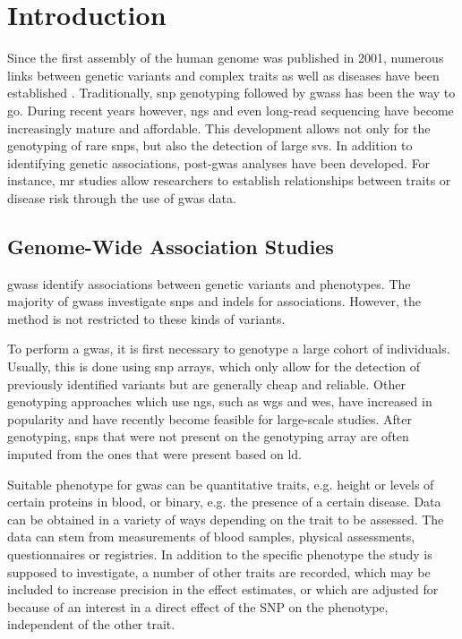 \documentclass[twoside=false]{scrbook}
\begin{document}
\tableofcontents

\mainmatter
\glsresetall
\chapter{Introduction}
Since the first assembly of the human genome was published in 2001, numerous links between genetic variants and complex traits as well as diseases have been established \cite{Lander2001}.
Traditionally, \gls{snp} genotyping followed by \glspl{gwas} has been the way to go.
During recent years however, \gls{ngs} and even long-read sequencing have become increasingly mature and affordable.
This development allows not only for the genotyping of rare \glspl{snp}, but also the detection of large \glspl{sv}.
In addition to identifying genetic associations, post-\gls{gwas} analyses have been developed.
For instance, \gls{mr} studies allow researchers to establish relationships between traits or disease risk through the use of \gls{gwas} data.

\section{Genome-Wide Association Studies}
\Glspl{gwas} identify associations between genetic variants and phenotypes.
The majority of \glspl{gwas} investigate \glspl{snp} and \glspl{indel} for associations.
However, the method is not restricted to these kinds of variants.

To perform a \gls{gwas}, it is first necessary to genotype a large cohort of individuals.
Usually, this is done using \gls{snp} arrays, which only allow for the detection of previously identified variants but are generally cheap and reliable.
Other genotyping approaches which use \gls{ngs}, such as \gls{wgs} and \gls{wes}, have increased in popularity and have recently become feasible for large-scale studies.
After genotyping, \glspl{snp} that were not present on the genotyping array are often imputed from the ones that were present based on \gls{ld}.

Suitable phenotype for \gls{gwas} can be quantitative traits, e.g. height or levels of certain proteins in blood, or binary, e.g. the presence of a certain disease.
Data can be obtained in a variety of ways depending on the trait to be assessed.
The data can stem from measurements of blood samples, physical assessments, questionnaires or registries.
In addition to the specific phenotype the study is supposed to investigate, a number of other traits are recorded, which may be included to increase precision in the effect estimates, or which are adjusted for because of an interest in a direct effect of the SNP on the phenotype, independent of the other trait.
\end{document}
